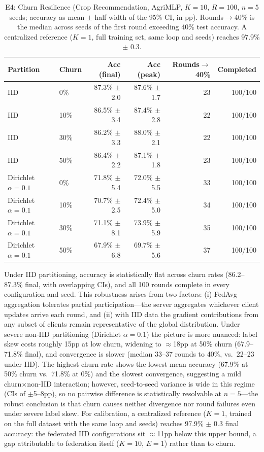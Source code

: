 ﻿\documentclass[journal]{IEEEtran}
\begin{document}
\begin{table}[t]
\centering
\caption{E4: Churn Resilience (Crop Recommendation, AgriMLP, $K{=}10$, $R{=}100$, $n{=}5$ seeds; accuracy as mean $\pm$ half-width of the 95\% CI, in pp). Rounds$\to$40\% is the median across seeds of the first round exceeding 40\% test accuracy. A centralized reference ($K{=}1$, full training set, same loop and seeds) reaches 97.9\% $\pm$ 0.3.}
\label{tab:e4}
\footnotesize
\begin{tabular}{l l r r r r}
\toprule
\textbf{Partition} & \textbf{Churn} & \textbf{Acc (final)} & \textbf{Acc (peak)} & \textbf{Rounds$\to$40\%} & \textbf{Completed} \\
\midrule
IID & 0\%  & 87.3\% $\pm$ 2.0 & 87.6\% $\pm$ 1.7 & 23 & 100/100 \\
IID & 10\% & 86.5\% $\pm$ 3.4 & 87.4\% $\pm$ 2.8 & 22 & 100/100 \\
IID & 30\% & 86.2\% $\pm$ 3.3 & 88.0\% $\pm$ 2.1 & 22 & 100/100 \\
IID & 50\% & 86.4\% $\pm$ 2.2 & 87.1\% $\pm$ 1.8 & 23 & 100/100 \\
\midrule
Dirichlet $\alpha{=}0.1$ & 0\%  & 71.8\% $\pm$ 5.4 & 72.0\% $\pm$ 5.5 & 33 & 100/100 \\
Dirichlet $\alpha{=}0.1$ & 10\% & 70.7\% $\pm$ 2.5 & 72.4\% $\pm$ 5.0 & 34 & 100/100 \\
Dirichlet $\alpha{=}0.1$ & 30\% & 71.1\% $\pm$ 8.1 & 73.9\% $\pm$ 5.9 & 35 & 100/100 \\
Dirichlet $\alpha{=}0.1$ & 50\% & 67.9\% $\pm$ 6.8 & 69.7\% $\pm$ 5.6 & 37 & 100/100 \\
\bottomrule
\end{tabular}
\end{table}

Under IID partitioning, accuracy is statistically flat across churn rates (86.2--87.3\% final, with overlapping CIs), and all 100 rounds complete in every configuration and seed. This robustness arises from two factors: (i) FedAvg aggregation tolerates partial participation---the server aggregates whichever client updates arrive each round, and (ii) with IID data the gradient contributions from any subset of clients remain representative of the global distribution. Under severe non-IID partitioning (Dirichlet $\alpha{=}0.1$) the picture is more nuanced: label skew costs roughly 15pp at low churn, widening to $\approx$18pp at 50\% churn (67.9--71.8\% final), and convergence is slower (median 33--37 rounds to 40\%, vs.\ 22--23 under IID). The highest churn rate shows the lowest mean accuracy (67.9\% at 50\% churn vs.\ 71.8\% at 0\%) and the slowest convergence, suggesting a mild churn$\times$non-IID interaction; however, seed-to-seed variance is wide in this regime (CIs of $\pm$5--8pp), so no pairwise difference is statistically resolvable at $n{=}5$---the robust conclusion is that churn causes neither divergence nor round failures even under severe label skew. For calibration, a centralized reference ($K{=}1$, trained on the full dataset with the same loop and seeds) reaches 97.9\% $\pm$ 0.3 final accuracy: the federated IID configurations sit $\approx$11pp below this upper bound, a gap attributable to federation itself ($K{=}10$, $E{=}1$) rather than to churn.
\end{document}
